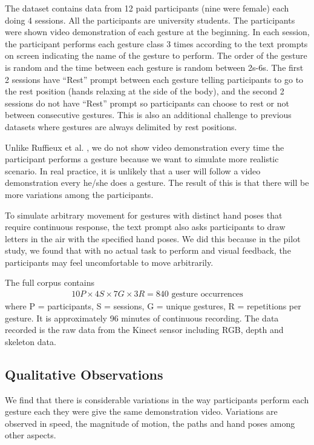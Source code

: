 \documentclass[conference]{IEEEtran}
\begin{document}
The dataset contains data from 12 paid participants (nine were female) each
doing 4 sessions. All the participants are university students.
The participants were shown video demonstration of each gesture at the beginning. In each
session, the participant performs each gesture class 3 times according to the
text prompts on screen indicating the name of the gesture to perform.
The order of the gesture is random and the time between each gesture is random
between 2s-6s. The first 2 sessions have ``Rest'' prompt between each gesture
telling participants to go to the rest position (hands relaxing at the side of
the body), and the second 2 sessions do not have ``Rest'' prompt so participants
can choose to rest or not between consecutive gestures. This is also an
additional challenge to previous datasets \cite{Ruffieux2013} where gestures are always
delimited by rest positions.

Unlike Ruffieux et al. \cite{Ruffieux2013}, we do not show video demonstration
every time the participant performs a gesture because we want to simulate more
realistic scenario. In real practice, it is unlikely that a user will follow a
video demonstration every he/she does a gesture. The result of this is that
there will be more variations among the participants.

To simulate arbitrary movement for gestures with distinct hand poses that
require continuous response, the text prompt also asks participants to draw
letters in the air with the specified hand poses. We did this because in the
pilot study, we found that with no actual task to perform and visual feedback,
the participants may feel uncomfortable to move arbitrarily.

The full corpus contains 
\begin{align*}
10P \times 4S \times 7G \times 3R = 840 \text{ gesture occurrences}
\end{align*}
where P = participants, S = sessions, G = unique gestures, R = repetitions per
gesture. It is approximately 96 minutes of continuous recording. The data
recorded is the raw data from the Kinect sensor including RGB, depth and
skeleton data.

\subsection{Qualitative Observations}
We find that there is considerable variations in the way participants perform
each gesture each they were give the same demonstration video. Variations are
observed in speed, the magnitude of motion, the paths and hand poses among other
aspects.
\end{document}
